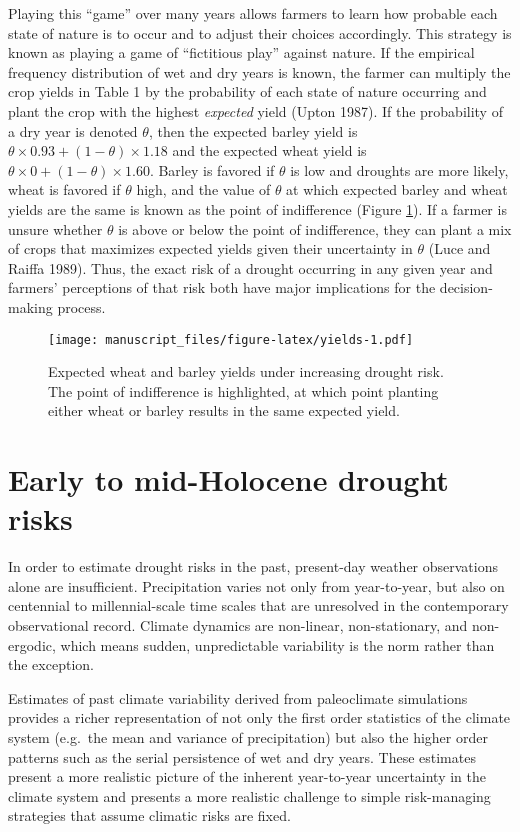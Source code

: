 \documentclass[smallextended]{svjour3}       %
\begin{document}
Playing this ``game'' over many years allows farmers to learn how probable each state of nature is to occur and to adjust their choices accordingly. This strategy is known as playing a game of ``fictitious play'' against nature. If the empirical frequency distribution of wet and dry years is known, the farmer can multiply the crop yields in Table 1 by the probability of each state of nature occurring and plant the crop with the highest \emph{expected} yield (Upton 1987). If the probability of a dry year is denoted \(\theta\), then the expected barley yield is \(\theta \times 0.93 + (1 - \theta) \times 1.18\) and the expected wheat yield is \(\theta \times 0 + (1 - \theta) \times 1.60\). Barley is favored if \(\theta\) is low and droughts are more likely, wheat is favored if \(\theta\) high, and the value of \(\theta\) at which expected barley and wheat yields are the same is known as the point of indifference (Figure \ref{fig:yields}). If a farmer is unsure whether \(\theta\) is above or below the point of indifference, they can plant a mix of crops that maximizes expected yields given their uncertainty in \(\theta\) (Luce and Raiffa 1989). Thus, the exact risk of a drought occurring in any given year and farmers' perceptions of that risk both have major implications for the decision-making process.

\begin{figure}
\centering
\texttt{[image: manuscript\_files/figure-latex/yields-1.pdf]}
\caption{\label{fig:yields}Expected wheat and barley yields under increasing drought risk. The point of indifference is highlighted, at which point planting either wheat or barley results in the same expected yield.}
\end{figure}

\hypertarget{sec:2}{%
\section{Early to mid-Holocene drought risks}\label{sec:2}}

In order to estimate drought risks in the past, present-day weather observations alone are insufficient. Precipitation varies not only from year-to-year, but also on centennial to millennial-scale time scales that are unresolved in the contemporary observational record. Climate dynamics are non-linear, non-stationary, and non-ergodic, which means sudden, unpredictable variability is the norm rather than the exception.

Estimates of past climate variability derived from paleoclimate simulations provides a richer representation of not only the first order statistics of the climate system (e.g.~the mean and variance of precipitation) but also the higher order patterns such as the serial persistence of wet and dry years. These estimates present a more realistic picture of the inherent year-to-year uncertainty in the climate system and presents a more realistic challenge to simple risk-managing strategies that assume climatic risks are fixed.
\end{document}
